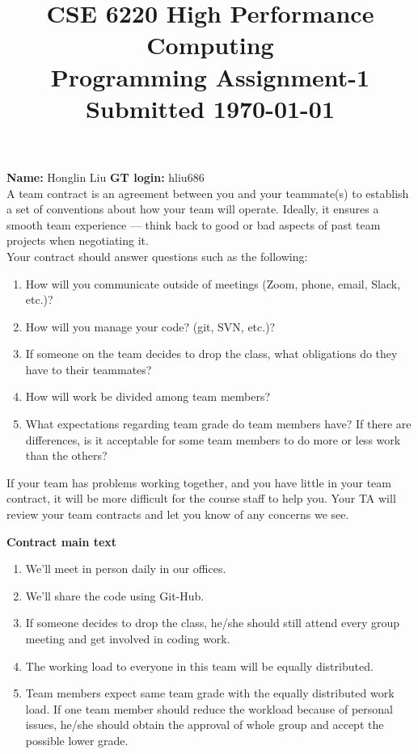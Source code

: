 \documentclass[11pt]{article}
\begin{document}
\title{\large\bf \vspace*{-0.3in}CSE 6220 High Performance Computing\\
Programming Assignment-1 \\Submitted \today}
\author{}
\date{}
\maketitle
\vspace*{-0.8in}
{\bf Name:} Honglin Liu \hfill{{\bf GT login:} hliu686}\\

A team contract is an agreement between you and your teammate(s) to establish a set of conventions about how your team will operate. 
Ideally, it ensures a smooth team experience — think back to good or bad aspects of past team projects when negotiating it.\\

Your contract should answer questions such as the following:
\begin{enumerate}
	\item How will you communicate outside of meetings (Zoom, phone, email, Slack, etc.)?
	\item How will you manage your code? (git, SVN, etc.)?
	\item If someone on the team decides to drop the class, what obligations do they have to their teammates?
	\item How will work be divided among team members?
	\item What expectations regarding team grade do team members have? If there are differences, is it acceptable for some team members to do more or less work than the others?
\end{enumerate}

If your team has problems working together, and you have little in your team contract, it will be more difficult for the course staff to help you. Your TA will review your team contracts and let you know of any concerns we see.


\newpage
\textbf{Contract main text}
\begin{enumerate}
	\item We'll meet in person daily in our offices.
	\item We'll share the code using Git-Hub.
	\item If someone decides to drop the class, he/she should still attend every group meeting and get involved in coding work.
 	\item The working load to everyone in this team will be equally distributed.
 	\item Team members expect same team grade with the equally distributed work load. If one team member should reduce the workload because of personal issues, he/she should obtain the approval of whole group and accept the possible lower grade.

\end{enumerate}
\end{document}
